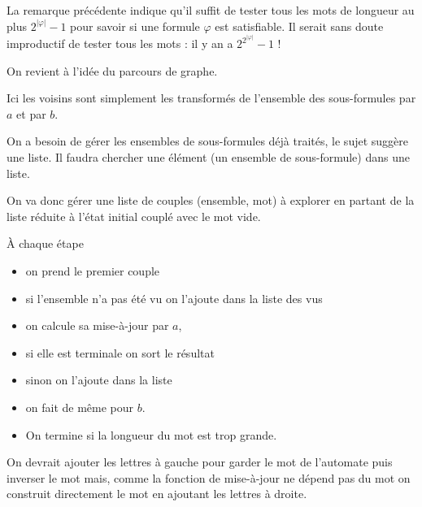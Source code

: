 \begin{Answer}
La remarque précédente indique qu'il suffit de tester tous les mots de longueur au plus $2^{|\varphi|}-1$ pour savoir si une formule $\varphi$ est satisfiable. Il serait sans doute improductif de tester tous les mots : il y an a $2^{2^{|\varphi|}}-1$ !

On revient à l'idée du parcours de graphe.

Ici les voisins sont simplement les transformés de l'ensemble des sous-formules par $a$ et par $b$.

On a besoin de gérer les ensembles de sous-formules déjà traités, le sujet suggère une liste. Il faudra chercher une élément (un ensemble de sous-formule) dans une liste.

On va donc gérer une liste de couples (ensemble, mot) à explorer en partant de la liste réduite à l'état initial couplé avec le mot vide.

À chaque étape

\begin{itemize}
  \item on prend le premier couple
  \item si l'ensemble n'a pas été vu on l'ajoute dans la liste des vus
  \item on calcule sa mise-à-jour par $a$,
  \item si elle est terminale on sort le résultat 
  \item sinon on l'ajoute dans la liste
  \item on fait de même pour $b$.
  \item On termine si la longueur du mot est trop grande.
\end{itemize}

%
%   
%
%
On devrait ajouter les lettres à gauche pour garder le mot de l'automate puis inverser le mot mais, comme la fonction de mise-à-jour ne dépend pas du mot on construit directement le mot en ajoutant les lettres à droite.


\end{Answer}
